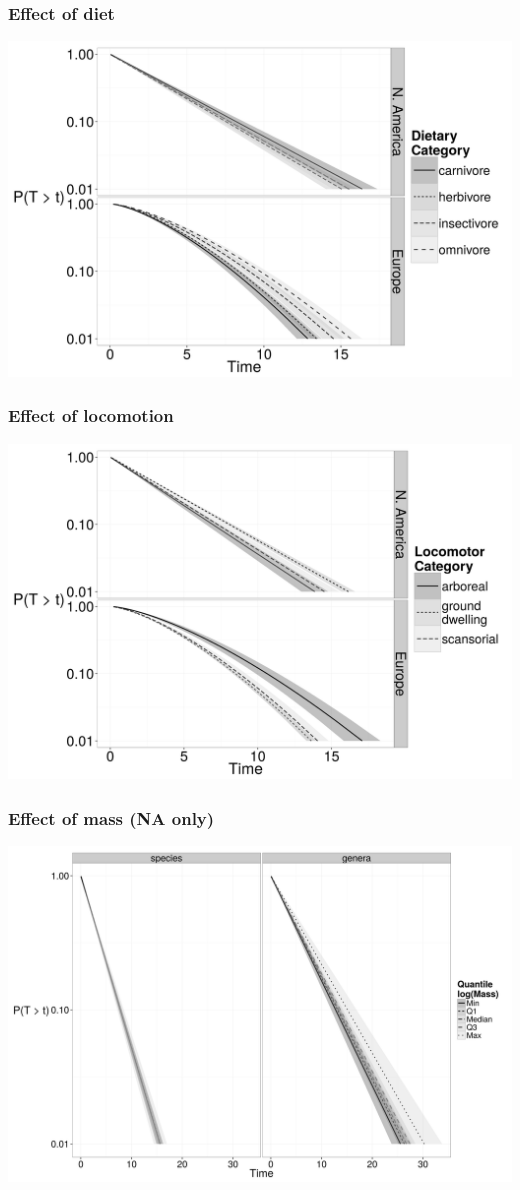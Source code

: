 \documentclass{beamer}
\begin{document}
\begin{frame}
  \frametitle{Effect of diet}
  \includegraphics[height=0.8\textheight,width=\textwidth,keepaspectratio=true]{figure/para_diet}
\end{frame}

\begin{frame}
  \frametitle{Effect of locomotion}
  \includegraphics[height=0.8\textheight,width=\textwidth,keepaspectratio=true]{figure/para_move}
\end{frame}

\begin{frame}
  \frametitle{Effect of mass (NA only)}
  \includegraphics[height=0.8\textheight,width=\textwidth,keepaspectratio=true]{figure/para_mass}
\end{frame}
\end{document}
